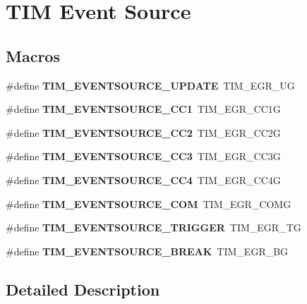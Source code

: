 \hypertarget{group___t_i_m___event___source}{}\section{T\+IM Event Source}
\label{group___t_i_m___event___source}
\subsection*{Macros}
\begin{DoxyCompactItemize}
\item 
\mbox{\label{group___t_i_m___event___source_ga6b9d1352735d2ddbafcaa31ae05cd1ee}} 
\#define {\bfseries T\+I\+M\+\_\+\+E\+V\+E\+N\+T\+S\+O\+U\+R\+C\+E\+\_\+\+U\+P\+D\+A\+TE}~T\+I\+M\+\_\+\+E\+G\+R\+\_\+\+UG
\item 
\mbox{\label{group___t_i_m___event___source_ga529eadf26cd17108dd95b9707a3d0f55}} 
\#define {\bfseries T\+I\+M\+\_\+\+E\+V\+E\+N\+T\+S\+O\+U\+R\+C\+E\+\_\+\+C\+C1}~T\+I\+M\+\_\+\+E\+G\+R\+\_\+\+C\+C1G
\item 
\mbox{\label{group___t_i_m___event___source_ga12e3a98c601f4f288354ac2538050e6b}} 
\#define {\bfseries T\+I\+M\+\_\+\+E\+V\+E\+N\+T\+S\+O\+U\+R\+C\+E\+\_\+\+C\+C2}~T\+I\+M\+\_\+\+E\+G\+R\+\_\+\+C\+C2G
\item 
\mbox{\label{group___t_i_m___event___source_ga1c2faf942ab525b44299ddd0a6d848e4}} 
\#define {\bfseries T\+I\+M\+\_\+\+E\+V\+E\+N\+T\+S\+O\+U\+R\+C\+E\+\_\+\+C\+C3}~T\+I\+M\+\_\+\+E\+G\+R\+\_\+\+C\+C3G
\item 
\mbox{\label{group___t_i_m___event___source_ga157e43c99e6a1c0097b184cc842b5dfb}} 
\#define {\bfseries T\+I\+M\+\_\+\+E\+V\+E\+N\+T\+S\+O\+U\+R\+C\+E\+\_\+\+C\+C4}~T\+I\+M\+\_\+\+E\+G\+R\+\_\+\+C\+C4G
\item 
\mbox{\label{group___t_i_m___event___source_ga5724ce4aaf842a2166edaaff1531c1d1}} 
\#define {\bfseries T\+I\+M\+\_\+\+E\+V\+E\+N\+T\+S\+O\+U\+R\+C\+E\+\_\+\+C\+OM}~T\+I\+M\+\_\+\+E\+G\+R\+\_\+\+C\+O\+MG
\item 
\mbox{\label{group___t_i_m___event___source_ga85573ed76442490db67e4b759fe6d901}} 
\#define {\bfseries T\+I\+M\+\_\+\+E\+V\+E\+N\+T\+S\+O\+U\+R\+C\+E\+\_\+\+T\+R\+I\+G\+G\+ER}~T\+I\+M\+\_\+\+E\+G\+R\+\_\+\+TG
\item 
\mbox{\label{group___t_i_m___event___source_ga83d16368fe3172a98c41d7c414780a64}} 
\#define {\bfseries T\+I\+M\+\_\+\+E\+V\+E\+N\+T\+S\+O\+U\+R\+C\+E\+\_\+\+B\+R\+E\+AK}~T\+I\+M\+\_\+\+E\+G\+R\+\_\+\+BG
\end{DoxyCompactItemize}


\subsection{Detailed Description}
